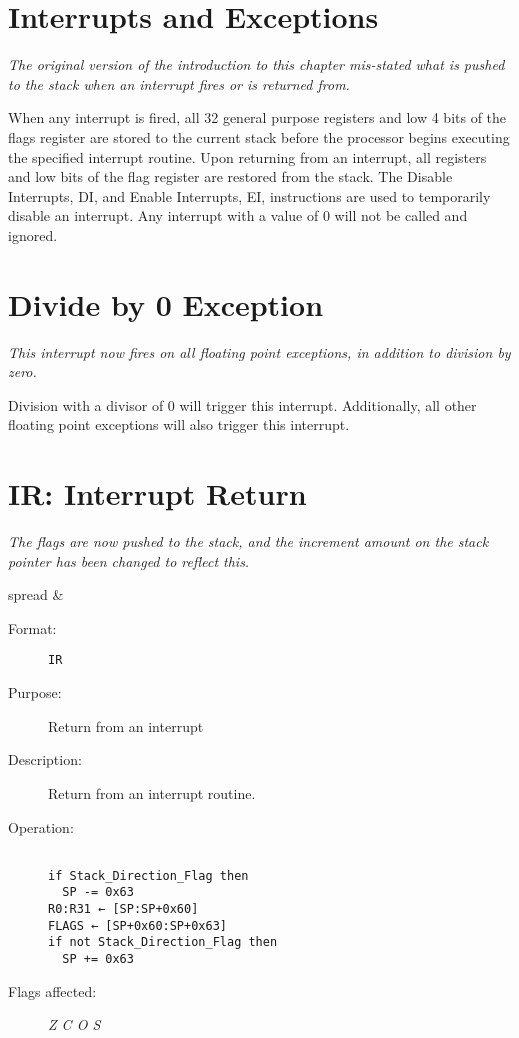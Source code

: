 \documentclass[oneside]{book}
\begin{document}
\setcounter{chapter}{3}
\setcounter{section}{-1}
\newpage
\section{Interrupts and Exceptions}

\textit{The original version of the introduction to this chapter mis-stated what
  is pushed to the stack when an interrupt fires or is returned from.}

When any interrupt is fired, all 32 general purpose registers and low 4 bits of the flags register are stored to the current stack before the processor begins executing the specified interrupt routine. Upon returning from an interrupt, all registers and low bits of the flag register are restored from the stack. The Disable Interrupts, DI, and Enable Interrupts, EI, instructions are used to temporarily disable an interrupt. Any interrupt with a value of 0 will not be called and ignored.


\setcounter{section}{2}


\section{Divide by 0 Exception}

\textit{This interrupt now fires on all floating point exceptions, in addition
  to division by zero.}

Division with a divisor of 0 will trigger this interrupt. Additionally, all other floating point exceptions will also trigger this interrupt.

\setcounter{chapter}{4}
\setcounter{section}{46}

\section{IR: Interrupt Return}

\textit{The flags are now pushed to the stack, and the increment amount on the
  stack pointer has been changed to reflect this.}

{
\setlength{\tabcolsep}{3pt}
\begin{tabu} spread \linewidth {l r}
 &  \\
\end{tabu}
}
\nopagebreak
\begin{description}
\item [Format:] \texttt{IR}
\item [Purpose:] Return from an interrupt
\item [Description:] Return from an interrupt routine.

\item [Operation:] \begin{verbatim}

if Stack_Direction_Flag then
  SP -= 0x63
R0:R31 ← [SP:SP+0x60]
FLAGS ← [SP+0x60:SP+0x63]
if not Stack_Direction_Flag then
  SP += 0x63\end{verbatim}
\item [Flags affected:] \textit{Z C O S}
\end{description}
\end{document}
